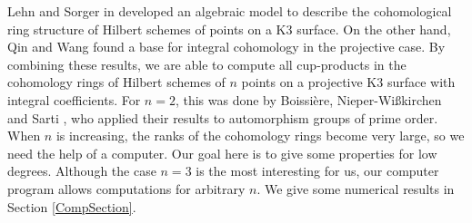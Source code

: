 
Lehn and Sorger in \cite{LehnSorger} developed an algebraic model to describe the cohomological ring structure of Hilbert schemes of points on a K3 surface. On the other hand, Qin and Wang \cite{QinWang} found a base for integral cohomology in the projective case. By combining these results, we are able to compute all cup-products in the cohomology rings of Hilbert schemes of $n$ points on a projective K3 surface with integral coefficients. 
For $n=2$, this was done by Boissi\`ere, Nieper-Wi{\ss}kirchen and Sarti \cite{BNS}, who applied their results to automorphism groups of prime order. When $n$ is increasing, the ranks of the cohomology rings become very large, so we need the help of a computer. 
Our goal here is to give some properties for low degrees.
Although the case $n=3$ is the most interesting for us, our computer program allows computations for arbitrary $n$. We give some numerical results in Section \ref{CompSection}.\vspace{5pt}

